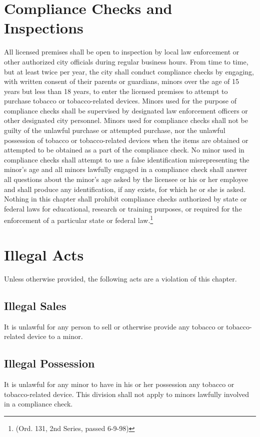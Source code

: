 \section{Compliance Checks and Inspections}
All licensed premises shall be open to inspection by local law enforcement or other authorized city officials during regular business hours. From time to time, but at least twice per year, the city shall conduct compliance checks by engaging, with written consent of their parents or guardians, minors over the age of 15 years but less than 18 years, to enter the licensed premises to attempt to purchase tobacco or tobacco-related devices. Minors used for the purpose of compliance checks shall be supervised by designated law enforcement officers or other designated city personnel.  Minors used for compliance checks shall not be guilty of the unlawful purchase or attempted purchase, nor the unlawful possession of tobacco or tobacco-related devices when the items are obtained or attempted to be obtained as a part of the compliance check. No minor used in compliance checks shall attempt to use a false identification misrepresenting the minor’s age and all minors lawfully engaged in a compliance check shall answer all questions about the minor’s age asked by the licensee or his or her employee and shall produce any identification, if any exists, for which he or she is asked.  Nothing in this chapter shall prohibit compliance checks authorized by state or federal laws for educational, research or training purposes, or required for the enforcement of a particular state or federal law.\footnote{(Ord. 131, 2nd Series, passed 6-9-98)}

\section{Illegal Acts}
Unless otherwise provided, the following acts are a violation of this chapter.
\subsection{Illegal Sales}
It is unlawful for any person to sell or otherwise provide any tobacco or tobacco-related device to a minor.
\subsection{Illegal Possession}
It is unlawful for any minor to have in his or her possession any tobacco or tobacco-related device. This division shall not apply to minors lawfully involved in a compliance check.
